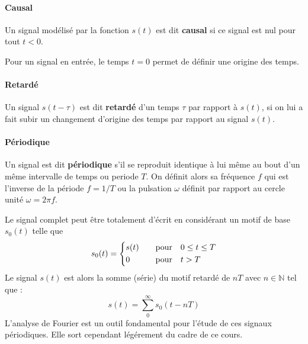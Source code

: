 \paragraph{Causal}

Un signal modélisé par la fonction $s(t)$ est dit \textbf{causal}
si ce signal est nul pour tout $t<0$. 
{
\begin{figure}[htb]
\centering
{}

\end{figure}
\setlength\intextsep{0pt}
}
Pour un signal en entrée, le temps $t=0$ permet de 
définir une origine des temps.

\paragraph{Retardé}
Un signal $s(t-\tau)$ est dit \textbf{retardé} d'un temps $\tau$ 
par rapport à $s(t)$, si on lui a fait subir un changement
d'origine des temps par rapport au signal $s(t)$.
\begin{center}

\end{center}

\paragraph{Périodique}
Un signal est dit \textbf{périodique} s'il se reproduit identique à lui
même au bout d'un même intervalle de temps ou periode $T$. On définit alors 
sa fréquence $f$ qui est l'inverse de la période $f=1/T$ ou la pulsation 
$\omega$ définit par rapport au cercle unité $\omega=2\pi f$.
{
\begin{figure}[!htb]
\centering
{}

\end{figure}
\setlength\intextsep{0pt}
}
Le signal complet peut être totalement d'écrit en considérant un motif de base 
$s_0(t)$ telle que
\begin{align*}
s_0(t) =
\begin{dcases}
    s(t)&\quad\text{pour}\quad 0\le t\le T   \\
    0&\quad\text{pour}\quad t>T
\end{dcases}
\end{align*}
Le signal $s(t)$ est alors la somme (série) du motif retardé de $nT$ 
avec $n\in\mathbb{N}$ tel que :
$$
s(t)=\sum_0^\infty s_0(t-nT)
$$
L'analyse de Fourier est un outil fondamental pour l'étude 
de ces signaux périodiques. Elle sort cependant légérement du cadre de 
ce cours.

